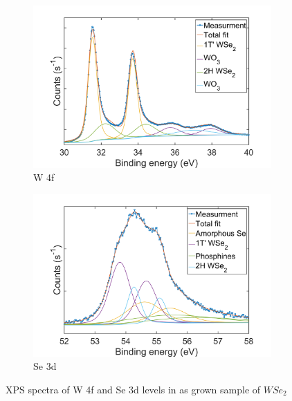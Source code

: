 \begin{figure}[H]
	\begin{center}
		\begin{subfigure}[b]{0.7\textwidth}
			\includegraphics[width=\textwidth]{1T'/XPSW4fPre.png}
			\caption{W 4f}
			\label{fig:1T'XPSW4fPreSpectrum}
		\end{subfigure}
		\qquad
		\begin{subfigure}[b]{0.7\textwidth}
			\includegraphics[width=\textwidth]{1T'/XPSSe3dPre.png}
			\caption{Se 3d}
			\label{fig:1T'XPSSe3dPreSpectrum}
		\end{subfigure}
		\caption{XPS spectra of W 4f and Se 3d levels in as grown sample of $WSe_2$}
		\label{fig:1T'XPSPreSpectra}
	\end{center}
\end{figure}


